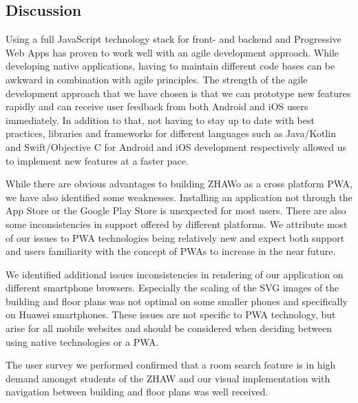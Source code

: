\begin{markdown}
\section{Discussion} \label{discussion}

Using a full JavaScript technology stack for front- and backend and Progressive Web Apps has proven to work well with an agile development approach. While developing native applications, having to maintain different code bases can be awkward in combination with agile principles. The strength of the agile development approach that we have chosen is that we can prototype new features rapidly and can receive user feedback from both Android and iOS users immediately. In addition to that, not having to stay up to date with best practices, libraries and frameworks for different languages such as Java/Kotlin and Swift/Objective C for Android and iOS development respectively allowed us to implement new features at a faster pace.

While there are obvious advantages to building ZHAWo as a cross platform PWA, we have also identified some weaknesses. Installing an application not through the App Store or the Google Play Store is unexpected for most users. There are also some inconsistencies in support offered by different platforms. We attribute most of our issues to PWA technologies being relatively new and expect both support and users familiarity with the concept of PWAs to increase in the near future. 

We identified additional issues inconsistencies in rendering of our application on different smartphone browsers. Especially the scaling of the SVG images of the building and floor plans was not optimal on some smaller phones and specifically on Huawei smartphones. These issues are not specific to PWA technology, but arise for all mobile websites and should be considered when deciding between using native technologies or a PWA.

The user survey we performed confirmed that a room search feature is in high demand amongst students of the ZHAW and our visual implementation with navigation between building and floor plans was well received.

\end{markdown}

